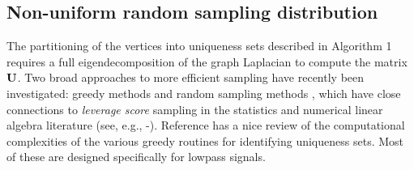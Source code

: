 \documentclass[journal, 10pt]{IEEEtran}
\begin{document}







\subsection{Non-uniform random sampling distribution}
The partitioning of the vertices into uniqueness sets described in Algorithm 1 requires a full eigendecomposition of the graph Laplacian to compute the matrix ${\bf U}$. Two broad approaches to more efficient sampling have recently been investigated: greedy methods \cite{chen2015discrete,anis2014towards,tsitsvero2016uncertainty,anis2016efficient} and random sampling methods \cite{shomorony,PuyTGV15,chen2016signal}, which have close connections to \emph{leverage score} sampling in the statistics and numerical linear algebra literature 
(see, e.g., \cite{drineas2012fast}\nocite{mahoney2009cur}-\cite{mahoney2011randomized}). 
Reference \cite{anis2016efficient} has a nice review of the computational complexities of the various greedy routines for identifying uniqueness sets. Most of these are designed specifically for lowpass signals. 
 
\end{document}
